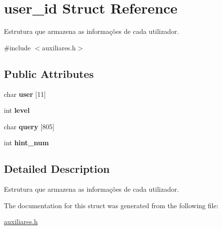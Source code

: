 \hypertarget{structuser__id}{\section{user\+\_\+id Struct Reference}
\label{structuser__id}
}


Estrutura que armazena as informações de cada utilizador.  




{\ttfamily \#include $<$auxiliares.\+h$>$}

\subsection*{Public Attributes}
\begin{DoxyCompactItemize}
\item 
\hypertarget{structuser__id_af6cd028a30409bbb6a398692cdd73e51}{char {\bfseries user} \mbox{[}11\mbox{]}}\label{structuser__id_af6cd028a30409bbb6a398692cdd73e51}

\item 
\hypertarget{structuser__id_af34e413f356fbcfc499417f503a383c2}{int {\bfseries level}}\label{structuser__id_af34e413f356fbcfc499417f503a383c2}

\item 
\hypertarget{structuser__id_a31beddd89186040ddf1c9a7aef6cc943}{char {\bfseries query} \mbox{[}805\mbox{]}}\label{structuser__id_a31beddd89186040ddf1c9a7aef6cc943}

\item 
\hypertarget{structuser__id_a4c47c8504a4902f49d7abe6f124f044b}{int {\bfseries hint\+\_\+num}}\label{structuser__id_a4c47c8504a4902f49d7abe6f124f044b}

\end{DoxyCompactItemize}


\subsection{Detailed Description}
Estrutura que armazena as informações de cada utilizador. 

The documentation for this struct was generated from the following file\+:\begin{DoxyCompactItemize}
\item 
\hyperlink{auxiliares_8h}{auxiliares.\+h}\end{DoxyCompactItemize}
